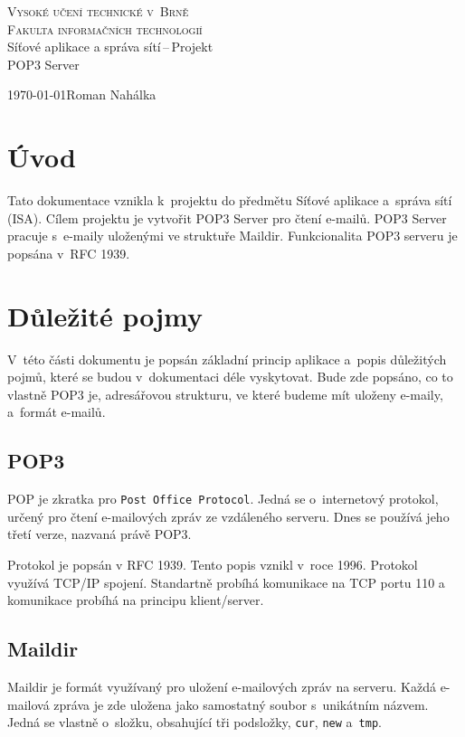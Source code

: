 \documentclass[a4paper, 11pt]{article}
\begin{document}
\begin{titlepage}
\begin{center}
{\Huge \textsc{Vysoké učení technické v~Brně}\\ \huge \textsc{Fakulta informačních technologií\\}}
{\LARGE Síťové aplikace a správa sítí\,--\,Projekt\\ \Huge POP3 Server}
\end{center}
{\Large \today \hfill Roman Nahálka}
\end{titlepage}

\tableofcontents

\newpage

\section{Úvod}
Tato dokumentace vznikla k~projektu do předmětu Síťové aplikace a~správa sítí (ISA). Cílem projektu je vytvořit POP3 \cite{POP3} Server pro čtení e-mailů. POP3 Server pracuje s~e-maily uloženými ve struktuře Maildir\cite{Maildir}. Funkcionalita POP3 serveru je popsána v~RFC 1939.

\section{Důležité pojmy}
V~této části dokumentu je popsán základní princip aplikace a~popis důležitých pojmů, které se budou v~dokumentaci déle vyskytovat. Bude zde popsáno, co to vlastně POP3 je, adresářovou strukturu, ve které budeme mít uloženy e-maily, a~formát e-mailů. 

\subsection{POP3}
POP je zkratka pro \texttt{Post Office Protocol}. Jedná se o~internetový protokol, určený pro čtení e-mailových zpráv ze vzdáleného serveru. Dnes se používá jeho třetí verze, nazvaná právě POP3.

Protokol je popsán v RFC 1939. Tento popis vznikl v~roce 1996. Protokol využívá TCP/IP spojení. Standartně probíhá komunikace na TCP portu 110 a komunikace probíhá na principu klient/server.


\subsection{Maildir}
Maildir je formát využívaný pro uložení e-mailových zpráv na serveru. Každá e-mailová zpráva je zde uložena jako samostatný soubor s~unikátním názvem. Jedná se vlastně o~složku, obsahující tři podsložky, \texttt{cur}, \texttt{new} a~\texttt{tmp}. 
\end{document}
